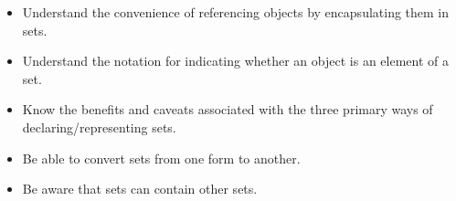 \begin{itemize}
  \item Understand the convenience of referencing objects by encapsulating them in sets.
  \item Understand the notation for indicating whether an object is an element of a set.
  \item Know the benefits and caveats associated with the three primary ways of declaring/representing sets.
  \item Be able to convert sets from one form to another.
  \item Be aware that sets can contain other sets.
\end{itemize}